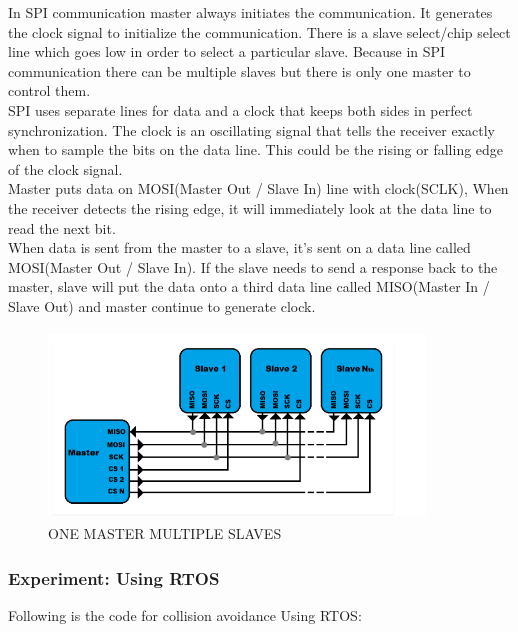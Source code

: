 \documentclass[11pt,a4paper]{book}
\begin{document}
	In SPI communication master always initiates the communication. It generates the clock signal to initialize the communication. There is a slave select/chip select line which goes low in order to select a particular slave. Because in SPI communication there can be multiple slaves but there is only one master to control them.\\
	SPI uses separate lines for data and a clock that keeps both sides in perfect synchronization. The clock is an oscillating signal that tells the receiver exactly when to sample the bits on the data line. This could be the rising  or falling edge of the clock signal.\\ 
	
	Master puts data on MOSI(Master Out / Slave In) line with clock(SCLK), When the receiver detects the rising edge, it will immediately look at the data line to read the next bit.\\ 
	
	When data is sent from the master to a slave, it’s sent on a data line called MOSI(Master Out / Slave In). If the slave needs to send a response back to the master,  slave will put the data onto a third data line called MISO(Master In / Slave Out) and master continue to generate clock. \begin{figure}[h]
		\centering
		\includegraphics[width=10cm,height=5cm]{multiplespi.PNG}
		\caption{ONE MASTER MULTIPLE SLAVES}
	\end{figure}
	\newpage
	\subsubsection{Experiment: Using RTOS}
	Following is the code for collision avoidance Using RTOS:\\
	
	
\end{document}

